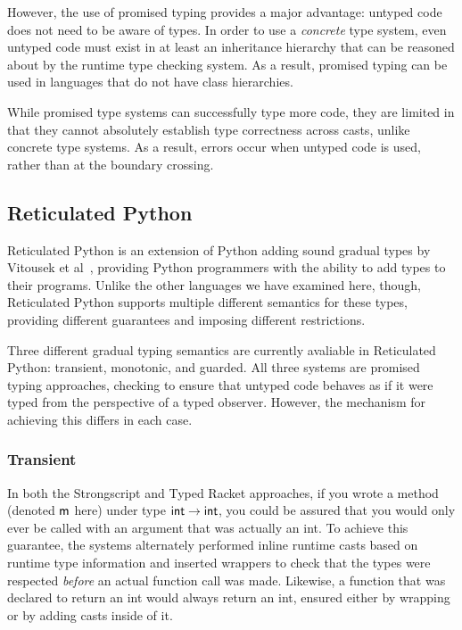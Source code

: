 \documentclass[a4paper,USenglish]{tex/lipics-v2016}
\begin{document}
However, the use of promised typing provides a major advantage: untyped code
does not need to be aware of types. In order to use a \emph{concrete} type
system, even untyped code must exist in at least an inheritance hierarchy
that can be reasoned about by the runtime type checking system. As a result,
promised typing can be used in languages that do not have class hierarchies.

While promised type systems can successfully type more code, they are
limited in that they cannot absolutely establish type correctness across
casts, unlike concrete type systems. As a result, errors occur when untyped
code is used, rather than at the boundary crossing.

\subsection{Reticulated Python}

Reticulated Python is an extension of Python adding sound gradual types by
Vitousek et al~\cite{siek14}, providing Python programmers with
the ability to add types to their programs. Unlike the other languages we
have examined here, though, Reticulated Python supports multiple different
semantics for these types, providing different guarantees and imposing
different restrictions.

Three different gradual typing semantics are currently avaliable in
Reticulated Python: transient, monotonic, and guarded. All three systems are
promised typing approaches, checking to ensure that untyped code behaves as
if it were typed from the perspective of a typed observer. However, the
mechanism for achieving this differs in each case.

\subsubsection{Transient}

In both the Strongscript and Typed Racket approaches, if you wrote a method
(denoted ${\sf{m}}$ here) under type ${\sf{int}} \rightarrow {\sf{int}}$, you could be
assured that you would only ever be called with an argument that was
actually an int. To achieve this guarantee, the systems alternately
performed inline runtime casts based on runtime type information and
inserted wrappers to check that the types were respected \emph{before} an
actual function call was made. Likewise, a function that was declared to
return an int would always return an int, ensured either by wrapping or by
adding casts inside of it.
\end{document}
